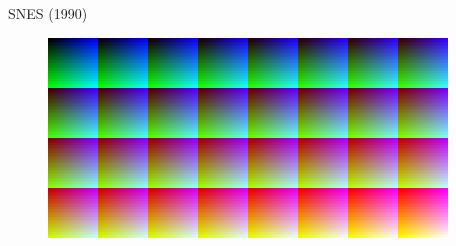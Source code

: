 \documentclass{beamer}
\begin{document}
\begin{darkframes}
\begin{frame}{SNES (1990)}
\begin{multicols}{2}
\begin{figure}[h!]
            \end{figure}
            \begin{figure}[h!]
                \centering
                \includegraphics[height=.2\textheight]{snes_palette}
            \end{figure}
        \end{multicols}
    \end{frame}


\end{darkframes}
\end{document}
